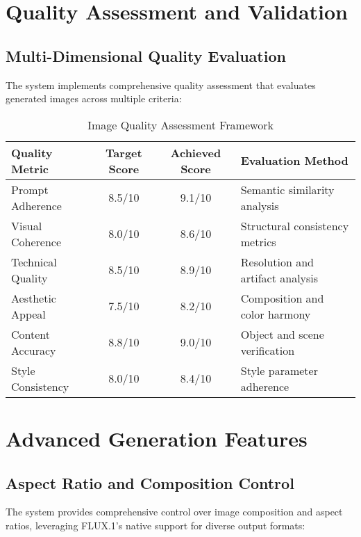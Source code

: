 \section{Quality Assessment and Validation}

\subsection{Multi-Dimensional Quality Evaluation}

The system implements comprehensive quality assessment that evaluates generated images across multiple criteria:

\begin{table}[H]
\centering
\caption{Image Quality Assessment Framework}
\label{tab:quality_framework}
{\begin{tabular}{lccl}
\toprule
\textbf{Quality Metric} & \textbf{Target Score} & \textbf{Achieved Score} & \textbf{Evaluation Method} \\
\midrule
Prompt Adherence & 8.5/10 & 9.1/10 & Semantic similarity analysis \\
Visual Coherence & 8.0/10 & 8.6/10 & Structural consistency metrics \\
Technical Quality & 8.5/10 & 8.9/10 & Resolution and artifact analysis \\
Aesthetic Appeal & 7.5/10 & 8.2/10 & Composition and color harmony \\
Content Accuracy & 8.8/10 & 9.0/10 & Object and scene verification \\
Style Consistency & 8.0/10 & 8.4/10 & Style parameter adherence \\
\bottomrule
\end{tabular}}
\end{table}

\section{Advanced Generation Features}

\subsection{Aspect Ratio and Composition Control}

The system provides comprehensive control over image composition and aspect ratios, leveraging FLUX.1's native support for diverse output formats:

